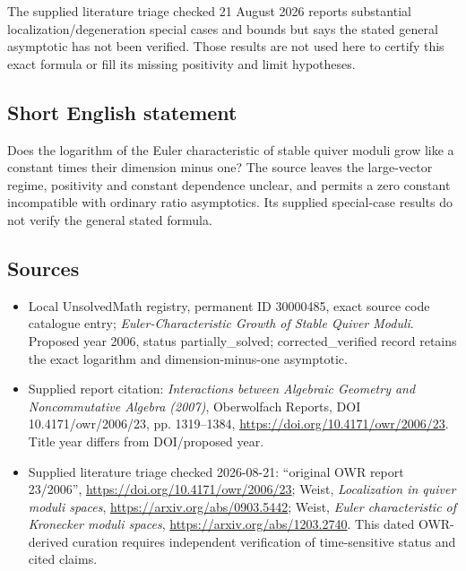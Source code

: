 \documentclass[11pt]{article}
\begin{document}
The supplied literature triage checked 21 August 2026 reports substantial localization/degeneration special cases and bounds but says the stated general asymptotic has not been verified. Those results are not used here to certify this exact formula or fill its missing positivity and limit hypotheses.
\subsection{Short English statement}
Does the logarithm of the Euler characteristic of stable quiver moduli grow like a constant times their dimension minus one? The source leaves the large-vector regime, positivity and constant dependence unclear, and permits a zero constant incompatible with ordinary ratio asymptotics. Its supplied special-case results do not verify the general stated formula.
\subsection{Sources}
\begin{itemize}
\item Local UnsolvedMath registry, permanent ID 30000485, exact source code catalogue entry; \emph{Euler-Characteristic Growth of Stable Quiver Moduli}. Proposed year 2006, status partially\_solved; corrected\_verified record retains the exact logarithm and dimension-minus-one asymptotic.
\item Supplied report citation: \emph{Interactions between Algebraic Geometry and Noncommutative Algebra (2007)}, Oberwolfach Reports, DOI 10.4171/owr/2006/23, pp. 1319--1384, \url{https://doi.org/10.4171/owr/2006/23}. Title year differs from DOI/proposed year.
\item Supplied literature triage checked 2026-08-21: ``original OWR report 23/2006'', \url{https://doi.org/10.4171/owr/2006/23}; Weist, \emph{Localization in quiver moduli spaces}, \url{https://arxiv.org/abs/0903.5442}; Weist, \emph{Euler characteristic of Kronecker moduli spaces}, \url{https://arxiv.org/abs/1203.2740}. This dated OWR-derived curation requires independent verification of time-sensitive status and cited claims.
\end{itemize}
\end{document}
